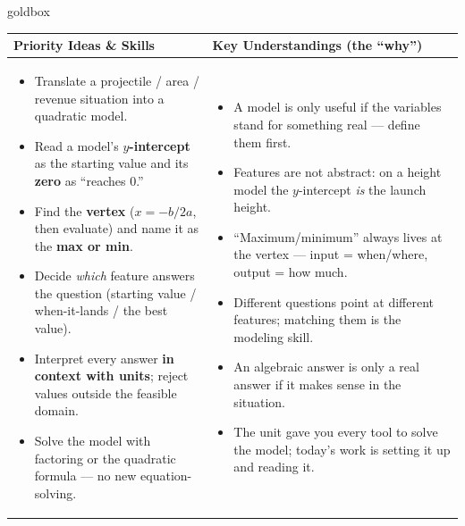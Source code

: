 \documentclass[10pt]{article}
\begin{document}
\renewcommand{\arraystretch}{1.4}
\begin{skillbox}{goldbox}
\begin{tabularx}{\linewidth}{@{}X|X@{}}
\textbf{Priority Ideas \& Skills} & \textbf{Key Understandings (the ``why'')} \\[2pt]
\hline
\vspace{-6pt}
\begin{itemize}[leftmargin=1.1em, nosep, after=\vspace{2pt}]
  \item Translate a projectile / area / revenue situation into a quadratic model.
  \item Read a model's \textbf{$y$-intercept} as the starting value and its \textbf{zero} as ``reaches $0$.''
  \item Find the \textbf{vertex} ($x=-b/2a$, then evaluate) and name it as the \textbf{max or min}.
  \item Decide \emph{which} feature answers the question (starting value / when-it-lands / the best value).
  \item Interpret every answer \textbf{in context with units}; reject values outside the feasible domain.
  \item Solve the model with factoring or the quadratic formula --- no new equation-solving.
\end{itemize}
&
\vspace{-6pt}
\begin{itemize}[leftmargin=1.1em, nosep, after=\vspace{2pt}]
  \item A model is only useful if the variables stand for something real --- define them first.
  \item Features are not abstract: on a height model the $y$-intercept \emph{is} the launch height.
  \item ``Maximum/minimum'' always lives at the vertex --- input = when/where, output = how much.
  \item Different questions point at different features; matching them is the modeling skill.
  \item An algebraic answer is only a real answer if it makes sense in the situation.
  \item The unit gave you every tool to solve the model; today's work is setting it up and reading it.
\end{itemize}
\end{tabularx}
\end{skillbox}
\end{document}
